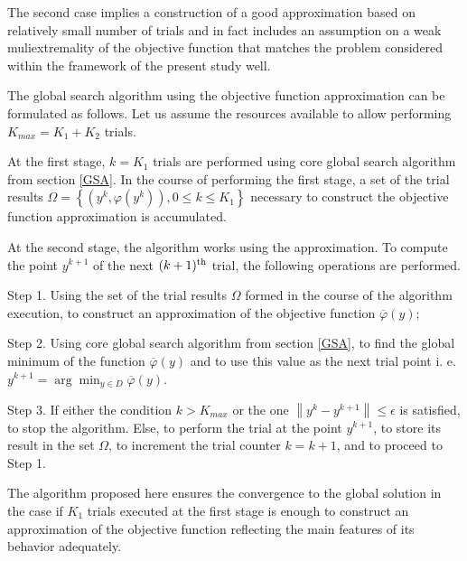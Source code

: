 \documentclass[applsci,article,submit,moreauthors,pdftex]{Definitions/mdpi}
\begin{document}
The second case implies a construction of a good approximation based on relatively small number of trials and in fact includes an assumption on a weak muliextremality of the objective function that matches the problem considered within the framework of the present study well.
 
The global search algorithm using the objective function approximation can be formulated as follows.
Let us assume the resources available to allow performing $K_{max} = K_1 + K_2$ trials.

At the first stage, $k = K_1$ trials are performed using core global search algorithm from section \ref{GSA}.
In the course of performing the first stage, a set of the trial results $\Omega = \left\{(y^k, \varphi(y^k)), 0\leq k\leq K_1\right\}$ necessary to construct the objective function approximation is accumulated.

At the second stage, the algorithm works using the approximation. To compute the point $y^{k+1}$ of the next $(k+1)^{\rm th}$ trial, the following operations are performed.

Step 1. Using the set of the trial results $\Omega$ formed in the course of the algorithm execution, to construct an approximation of the objective function $\overline{\varphi}(y)$;

Step 2. Using core global search algorithm from section \ref{GSA}, to find the global minimum of the function $\overline{\varphi}(y)$ and to use this value as the next trial point i. e. $y^{k+1} = \arg \min_{y \in D} \overline{\varphi}(y)$.

Step 3. If either the condition $k>K_{max}$ or the one $\left\|y^k - y^{k+1}\right\| \leq \epsilon$ is satisfied, to stop the algorithm.
Else, to perform the trial at the point $y^{k+1}$, to store its result in the set $\Omega$, to increment the trial counter $k = k+1$, and to proceed to Step 1.

The algorithm proposed here ensures the convergence to the global solution in the case if $K_1$ trials executed at the first stage is enough to construct an approximation of the objective function reflecting the main features of its behavior adequately.



\end{document}
